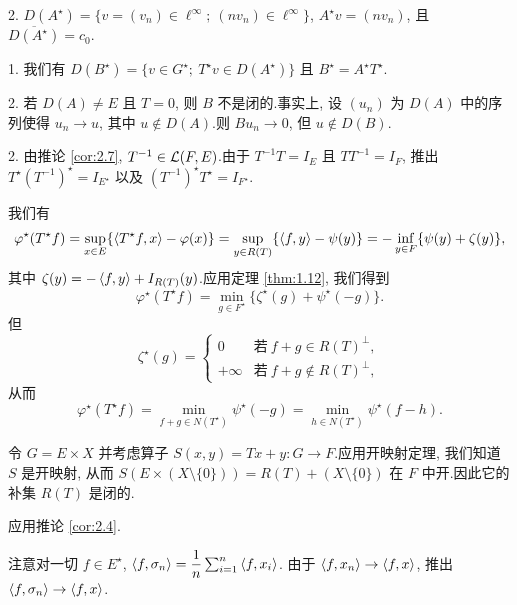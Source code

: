 2. $D(A^\star)=\{v=(v_n)\in\ell^\infty;\ (nv_n)\in\ell^\infty\}$,
$A^\star v=(nv_n)$, 且 $\overline{D(A^\star)}=c_0$.


1. 我们有 $D(B^\star)=\{v\in G^\star;\ T^\star v\in D(A^\star)\}$ 且
$B^\star=A^\star T^\star$.

2. 若 $D(A)\ne E$ 且 $T=0$, 则 $B$ 不是闭的.事实上, 设 $(u_n)$ 为 $D(A)$
中的序列使得 $u_n\to u$, 其中 $u\notin D(A)$.则 $Bu_n\to0$, 但 $u\notin D(B)$.


2. 由推论  \ref{cor:2.7}, $T^{-1}\in\mathcal{L}(F,E)$.由于 $T^{-1}T=I_E$ 且
$TT^{-1}=I_F$, 推出 $T^\star(T^{-1})^\star=I_{E^\star}$ 以及
$(T^{-1})^\star T^\star=I_{F^\star}$.


我们有
\begin{equation*}
\varphi^\star(T^\star f)=\sup_{x\in E}\{\left\langle T^\star f,x\right\rangle-\varphi(x)\}
=\sup_{y\in R(T)}\{\left\langle f,y\right\rangle-\psi(y)\}
=-\inf_{y\in F}\{\psi(y)+\zeta(y)\},
\end{equation*}
其中 $\zeta(y)=-\left\langle f,y\right\rangle+I_{R(T)}(y)$.应用定理  \ref{thm:1.12}, 我们得到
\begin{equation*}
\varphi^\star(T^\star f)=\min_{g\in F^\star}\{\zeta^\star(g)+\psi^\star(-g)\}.
\end{equation*}
但
\begin{equation*}
\zeta^\star(g)=\begin{cases}
0 & \text{若}\ f+g\in R(T)^\perp,\\
+\infty & \text{若}\ f+g\notin R(T)^\perp,
\end{cases}
\end{equation*}
从而
\begin{equation*}
\varphi^\star(T^\star f)=\min_{f+g\in N(T^\star)}\psi^\star(-g)
=\min_{h\in N(T^\star)}\psi^\star(f-h).
\end{equation*}


令 $G=E\times X$ 并考虑算子 $S(x,y)=Tx+y:G\to F$.应用开映射定理, 我们知道
$S$ 是开映射, 从而 $S(E\times(X\setminus\{0\}))=R(T)+(X\setminus\{0\})$ 在
$F$ 中开.因此它的补集 $R(T)$ 是闭的.

应用推论  \ref{cor:2.4}.


注意对一切 $f\in E^\star$, $\left\langle f,\sigma_n\right\rangle=\dfrac1n\sum_{i=1}^n\left\langle f,x_i\right\rangle$.
由于 $\left\langle f,x_n\right\rangle\to\left\langle f,x\right\rangle$, 推出 $\left\langle f,\sigma_n\right\rangle\to\left\langle f,x\right\rangle$.

